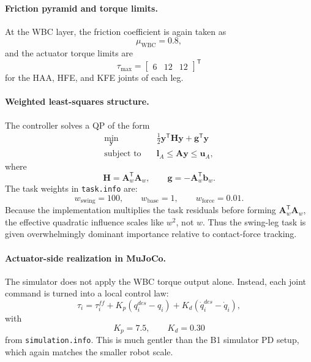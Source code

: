 \documentclass[11pt,a4paper]{article}
\newcommand{\vect}[1]{\boldsymbol{#1}}
\newcommand{\mat}[1]{\mathbf{#1}}
\newcommand{\trans}{^{\mathsf T}}
\newcommand{\code}[1]{\texttt{#1}}
\begin{document}
\paragraph{Friction pyramid and torque limits.}
At the WBC layer, the friction coefficient is again taken as
\begin{equation}
\mu_{\mathrm{WBC}} = 0.8,
\end{equation}
and the actuator torque limits are
\begin{equation}
\tau_{\max} =
\begin{bmatrix}
6 & 12 & 12
\end{bmatrix}\trans
\end{equation}
for the HAA, HFE, and KFE joints of each leg.

\paragraph{Weighted least-squares structure.}
The controller solves a QP of the form
\begin{align}
\min_{\vect{y}} \quad &
\frac{1}{2}\vect{y}\trans \mat{H}\vect{y} + \vect{g}\trans\vect{y} \\
\text{subject to} \quad &
\vect{l}_A \le \mat{A}\vect{y} \le \vect{u}_A,
\end{align}
where
\begin{equation}
\mat{H} = \mat{A}_w\trans\mat{A}_w, \qquad
\vect{g} = -\mat{A}_w\trans \vect{b}_w.
\end{equation}
The task weights in \code{task.info} are:
\begin{equation}
w_{\mathrm{swing}} = 100, \qquad
w_{\mathrm{base}} = 1, \qquad
w_{\mathrm{force}} = 0.01.
\end{equation}
Because the implementation multiplies the task residuals before forming $\mat{A}_w\trans\mat{A}_w$, the effective quadratic influence
scales like $w^2$, not $w$. Thus the swing-leg task is given overwhelmingly dominant importance relative to contact-force tracking.

\paragraph{Actuator-side realization in MuJoCo.}
The simulator does not apply the WBC torque output alone. Instead, each joint command is turned into a local control law:
\begin{equation}
\tau_i =
\tau_i^{ff}
+ K_p\left(q_i^{des} - q_i\right)
+ K_d\left(\dot{q}_i^{des} - \dot{q}_i\right),
\end{equation}
with
\begin{equation}
K_p = 7.5, \qquad K_d = 0.30
\end{equation}
from \code{simulation.info}. This is much gentler than the B1 simulator PD setup, which again matches the smaller robot scale.
\end{document}
